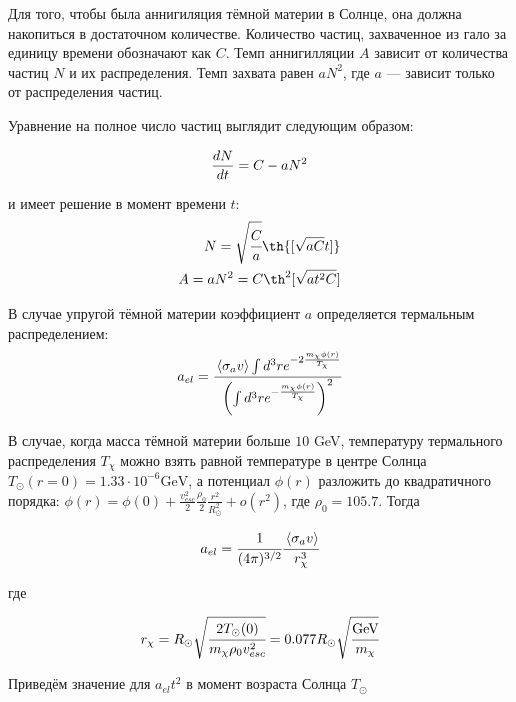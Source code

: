 Для того, чтобы была аннигиляция тёмной материи в Солнце, она должна накопиться в достаточном количестве. Количество частиц, захваченное из гало за единицу времени обозначают как $C$. Темп аннигилляции $A$ зависит от количества частиц $N$ и их распределения. Темп захвата равен $aN^2$, где $a$ --- зависит только от распределения частиц. 

Уравнение на полное число частиц выглядит следующим образом:

\begin{equation}
	\frac{d N}{d t} = C - aN^2
\end{equation}

\noindent и имеет решение в момент времени $t$:
\begin{equation}
\begin{split}
	N = \sqrt{\cfrac{C}{a}} \th{[\sqrt{aC}t]} \\
	A = aN^2 = C \th^2{[\sqrt{at^2C}]}
	\label{eq:AnnNtherm}
\end{split}
\end{equation}
	

В случае упругой тёмной материи коэффициент $a$ определяется термальным распределением:
\begin{equation}
	a_{el} = \cfrac{
		\left\langle \sigma_{a}v \right\rangle \int{d^3 r e^{-2 \frac{m_{\chi}\phi(r)}{T_{\chi}} }}
	}{\left(
		\int{d^3 r e^{- \frac{m_{\chi}\phi(r)}{T_{\chi}} }}
	\right)^2}
\end{equation}

В случае, когда масса тёмной материи больше $10$ GeV, температуру термального распределения $T_{\chi}$ можно взять равной температуре в центре Солнца $T_{\odot}(r=0) = 1.33\cdot10^{-6} \text{GeV}$, а потенциал $\phi(r)$ разложить до квадратичного порядка: $\phi(r) =\phi(0)+ \frac{v_{esc}^2}{2} \frac{\rho_0}{2} \frac{r^2}{R_{\odot}^2} + o(r^2)$,  где $\rho_0 = 105.7$. Тогда

\begin{equation}
	a_{el} = \cfrac{1}{(4\pi)^{3/2}} \cfrac{\left\langle \sigma_{a}v \right\rangle}{ r_{\chi}^3 }
\end{equation}

где

\begin{equation}
	r_{\chi} = R_{\odot} \sqrt{\cfrac{2 T_{\odot}(0) }{m_{\chi}\rho_0 v_{esc}^2}} =  0.077 R_{\odot} \sqrt{\cfrac{ \text{GeV}}{m_{\chi}}}
\end{equation}

Приведём значение для $a_{el}t^2$ в момент возраста Солнца $T_{\odot}$

